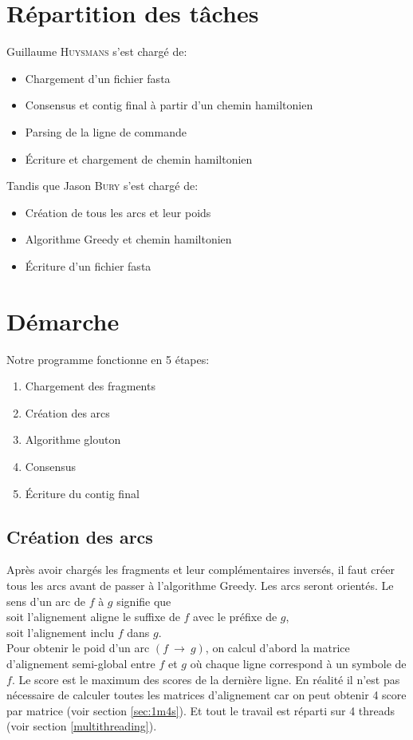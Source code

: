 \documentclass[a4paper, 12pt, titlepage]{article}
\newcommand{\arc}[2]{$(#1~\rightarrow~#2)$}
\begin{document}



\section{Répartition des tâches}
\noindent Guillaume \textsc{Huysmans} s'est chargé de:
\begin{itemize}
 \item Chargement d'un fichier fasta
 \item Consensus et contig final à partir d'un chemin hamiltonien
 \item Parsing de la ligne de commande
 \item Écriture et chargement de chemin hamiltonien
\end{itemize}
\noindent Tandis que Jason \textsc{Bury} s'est chargé de:
\begin{itemize}
 \item Création de tous les arcs et leur poids
 \item Algorithme Greedy et chemin hamiltonien
 \item Écriture d'un fichier fasta
\end{itemize}

\section{Démarche}
Notre programme fonctionne en 5 étapes:
\begin{enumerate}
 \item Chargement des fragments
 \item Création des arcs
 \item Algorithme glouton
 \item Consensus
 \item Écriture du contig final
\end{enumerate}

\subsection{Création des arcs}
Après avoir chargés les fragments et leur complémentaires inversés, il faut créer tous les arcs avant de passer à l'algorithme Greedy.
Les arcs seront orientés. Le sens d'un arc de $f$ à $g$ signifie que\\
soit l'alignement aligne le suffixe de $f$ avec le préfixe de $g$,\\
soit l'alignement inclu $f$ dans $g$.\\
Pour obtenir le poid d'un arc \arc{f}{g},
on calcul d'abord la matrice d'alignement semi-global entre $f$ et $g$ où chaque ligne correspond à un symbole de $f$.
Le score est le maximum des scores de la dernière ligne.
En réalité il n'est pas nécessaire de calculer toutes les matrices d'alignement car on peut obtenir 4 score par matrice (voir section \ref{sec:1m4s}).
Et tout le travail est réparti sur 4 threads (voir section \ref{multithreading}).
\end{document}
